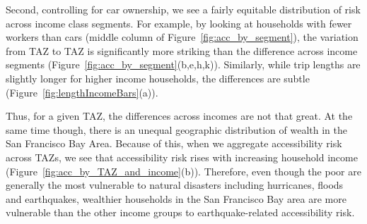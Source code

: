 Second, controlling for car ownership, we see a fairly equitable distribution of risk across income class segments.  For example, by looking at households with fewer workers than cars (middle column of Figure~\ref{fig:acc_by_segment}), the variation from TAZ to TAZ is significantly more striking than the difference across income segments (Figure~\ref{fig:acc_by_segment}{(b,e,h,k)}). Similarly, while trip lengths are slightly longer for higher income households, the differences are subtle (Figure~\ref{fig:lengthIncomeBars}{(a)}).


Thus, for a given TAZ, the differences across incomes are not that great. At the same time though, there is an unequal geographic distribution of wealth in the San Francisco Bay Area. Because of this, when we aggregate accessibility risk across TAZs, we see that accessibility risk rises with increasing household income  (Figure~\ref{fig:acc_by_TAZ_and_income}{(b)}). Therefore, even though the poor are generally the most vulnerable to natural disasters including hurricanes, floods and earthquakes,  wealthier households in the San Francisco Bay area are more vulnerable than the other income groups to earthquake-related accessibility risk.







